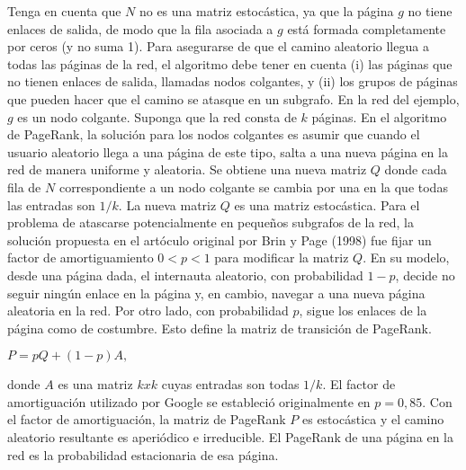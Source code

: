 \begin{ejer}
    \par Tenga en cuenta que $N$ no es una matriz estocástica, ya que la página $g$ no tiene enlaces de salida, 
    de modo que la fila asociada a $g$ está formada completamente por ceros (y no suma 1). 
    Para asegurarse de que el camino aleatorio llegua a todas las páginas de la red, el algoritmo debe tener en cuenta (i) 
    las páginas que no tienen enlaces de salida, llamadas nodos colgantes, y (ii) los grupos de páginas que pueden hacer que el camino se atasque en un subgrafo. 
    En la red del ejemplo, $g$ es un nodo colgante. Suponga que la red consta de $k$ páginas. En el algoritmo de PageRank, la solución para los nodos colgantes es 
    asumir que cuando el usuario aleatorio llega a una página de este tipo, salta a una nueva página en la red de manera uniforme y aleatoria.
    Se obtiene una nueva matriz $Q$ donde cada fila de $N$ correspondiente a un nodo colgante se cambia por una en la que todas las entradas son $1/k$. 
    La nueva matriz $Q$ es una matriz estocástica. Para el problema de atascarse potencialmente en pequeños subgrafos de la red, la solución propuesta en el 
    artóculo original por Brin y Page (1998) fue fijar un factor de amortiguamiento $0 < p < 1$ para modificar la matriz $Q$. En su modelo, desde una página dada, 
    el internauta aleatorio, con probabilidad $1 - p$, decide no seguir ningún enlace en la página y, en cambio, navegar a una nueva página aleatoria en la red.
    Por otro lado, con probabilidad $p$, sigue los enlaces de la página como de costumbre. Esto define la matriz de transición de PageRank.
    \par $P =pQ+(1-p)A,$
    \par donde $A$ es una matriz $k x k$ cuyas entradas son todas $1/k$. El factor de amortiguación utilizado por Google se estableció originalmente en $p = 0,85$. 
    Con el factor de amortiguación, la matriz de PageRank $P$ es estocástica y el camino aleatorio resultante es aperiódico e irreducible. 
    El PageRank de una página en la red es la probabilidad estacionaria de esa página.
\end{ejer}